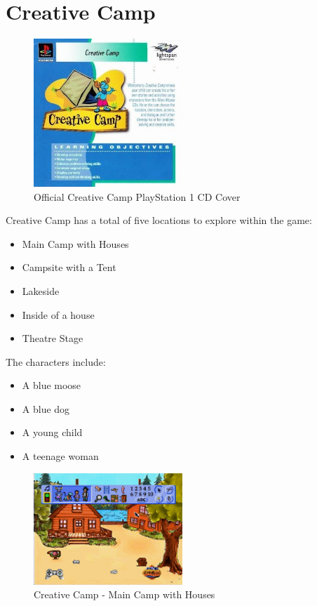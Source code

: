 \chapter{Creative Camp}

\begin{figure}[H]
    \centering
    \includegraphics[width=0.5\textwidth]{"./Games/Creative/Images/CreativeCampCDCover.jpg"}
    \caption{Official Creative Camp PlayStation 1 CD Cover}
\end{figure}

Creative Camp has a total of five locations to explore within the game:

\begin{itemize}
    \item Main Camp with Houses
    \item Campsite with a Tent
    \item Lakeside
    \item Inside of a house
    \item Theatre Stage
\end{itemize}

The characters include:
\begin{itemize}
    \item A blue moose
    \item A blue dog
    \item A young child
    \item A teenage woman
\end{itemize}

\begin{figure}[H]
    \centering
    \includegraphics[width=0.5\textwidth]{"./Games/Creative/Images/CreativeCampScreenshot1.jpg"}
    \caption{Creative Camp - Main Camp with Houses}
\end{figure}

